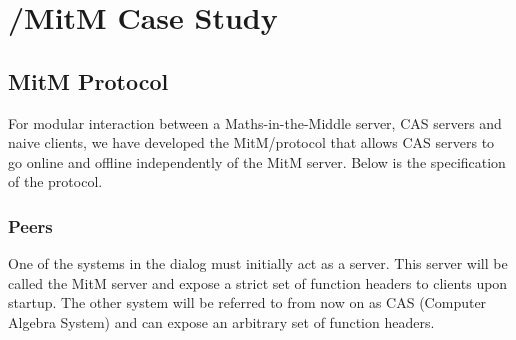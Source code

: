 \section{\GAP/\Singular MitM Case Study}\label{sec:mitm_poc}
\subsection{MitM Protocol}

For modular interaction between a Maths-in-the-Middle server, CAS \SCSCP servers 
and naive clients, we have developed the MitM/\SCSCP protocol that allows CAS 
servers to go online and offline independently of the MitM server. Below is the 
specification of the protocol.

\subsubsection{Peers}
One of the systems in the dialog must initially act as a server. This server will 
be called the MitM server and expose a strict set of function headers to clients 
upon startup. The other system will be referred to from now on as CAS (Computer 
Algebra System) and can expose an arbitrary set of function headers.

